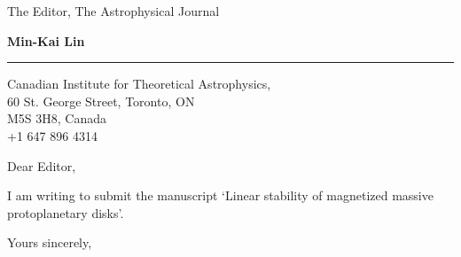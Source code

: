 \documentclass{letter} %
\begin{document}
\signature{Min-Kai Lin}           %
\longindentation=0pt                       %
\let\raggedleft\raggedright                %
 
 
\begin{letter}{The Editor, The Astrophysical Journal}


\begin{flushleft}
{\large\bf Min-Kai Lin}
\end{flushleft}
\medskip\hrule height 1pt
\begin{flushright}
\hfill Canadian Institute for Theoretical Astrophysics, \\
\hfill 60 St. George Street, Toronto, ON \\
\hfill M5S 3H8, Canada\\
\hfill +1 647 896 4314
\end{flushright} 
\vfill %

 
\opening{Dear Editor,} 
 
I am writing to submit the manuscript `Linear stability of magnetized massive protoplanetary disks'. 

\closing{Yours sincerely,} 
 
 

\end{letter}
 
\end{document}
